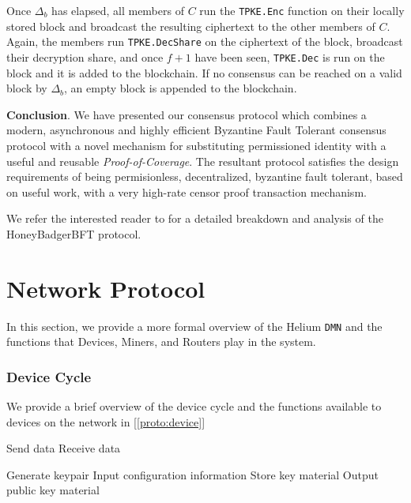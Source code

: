 \documentclass[UTF8, 10pt, nonatbib, nocopyrightspace, reprint]{sigplanconf}
\newenvironment{protocol}[2]{
  \begin{algorithm}[!htb]
    \DontPrintSemicolon
    \caption{#1}\label{#2}
}{
  \end{algorithm}
  \FloatBarrier
}
\newcommand{\protoref}[1]{[\autoref{#1}]}
\begin{document}
Once $\Delta_b$ has elapsed, all members of $C$ run the \verb|TPKE.Enc| function on their locally stored block and broadcast the resulting ciphertext to the other members of $C$. Again, the members run \verb|TPKE.DecShare| on the ciphertext of the block, broadcast their decryption share, and once $f + 1$ have been seen, \verb|TPKE.Dec| is run on the block and it is added to the blockchain. If no consensus can be reached on a valid block by $\Delta_b$, an empty block is appended to the blockchain.

\textbf{Conclusion}. We have presented our consensus protocol which combines a modern, asynchronous and highly efficient Byzantine Fault Tolerant consensus protocol with a novel mechanism for substituting permissioned identity with a useful and reusable \emph{Proof-of-Coverage}. The resultant protocol satisfies the design requirements of being permisionless, decentralized, byzantine fault tolerant, based on useful work, with a very high-rate censor proof transaction mechanism.

We refer the interested reader to \cite{honeybadger} for a detailed breakdown and analysis of the HoneyBadgerBFT protocol.

\section{Network Protocol}

In this section, we provide a more formal overview of the Helium \verb|DMN| and the functions that Devices, Miners, and Routers play in the system.

\subsubsection{Device Cycle}

We provide a brief overview of the device cycle and the functions available to devices on the network in \protoref{proto:device}

\begin{protocol}{Device Protocol Overview}{proto:device}

   {
    Send data \;
    Receive data \;
  }

   {
    Generate keypair \;
    Input configuration information \;
    Store key material \;
    Output public key material \;
  }
\end{protocol}
\end{document}
